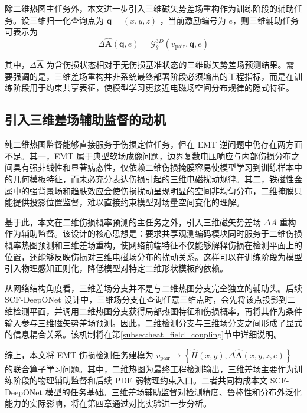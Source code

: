 除二维热图主任务外，本文进一步引入三维磁矢势差场重构作为训练阶段的辅助任务。设三维归一化查询点为
$
\mathbf q=(x,y,z)
$
，当前激励编号为 $e$，则三维辅助任务可表示为
\begin{equation}
\label{eq:field_task}
\Delta \hat{\mathbf A}(\mathbf q,e)
=
\mathcal{G}_{\theta}^{3D}
\left(
v_{\mathrm{pair}},\mathbf q,e
\right)
\end{equation}

其中，$\Delta \hat{\mathbf A}$ 为含伤损状态相对于无伤损基准状态的三维磁矢势差场预测结果。需要强调的是，三维差场重构并非系统最终部署阶段必须输出的工程指标，而是在训练阶段用于约束共享表征，使模型学习更接近电磁场空间分布规律的隐式特征。

\subsection{引入三维差场辅助监督的动机}
\label{subsec:auxiliary_field_motivation}

纯二维热图监督能够直接服务于伤损定位任务，但在 EMT 逆问题中仍存在两方面不足。其一，EMT 属于典型软场成像问题，边界复数电压响应与内部伤损分布之间具有强非线性和显著病态性，仅依赖二维伤损掩膜容易使模型学习到训练样本中的几何模板特征，而未必充分表达伤损引起的三维电磁扰动规律。其二，铁磁性金属中的强背景场和趋肤效应会使伤损扰动呈现明显的空间非均匀分布，二维掩膜只能提供投影位置监督，难以直接约束模型对场量空间变化的理解。

基于此，本文在二维伤损概率预测的主任务之外，引入三维磁矢势差场 $\Delta A$ 重构作为辅助监督。该设计的核心思想是：要求共享观测编码模块同时服务于二维伤损概率热图预测和三维差场重构，使网络前端特征不仅能够解释伤损在检测平面上的位置，还能够反映伤损对三维电磁场分布的扰动关系。这样可以在训练阶段为模型引入物理感知正则化，降低模型对特定二维形状模板的依赖。

从网络结构角度看，三维差场分支并不是与二维热图分支完全独立的辅助头。后续 SCF-DeepONet 设计中，三维场分支在查询任意三维点时，会先将该点投影到二维检测平面，并调用二维热图分支获得局部热图特征和伤损概率，再将其作为条件输入参与三维磁矢势差场预测。因此，二维检测分支与三维场分支之间形成了显式的信息耦合关系。该机制将在第\ref{subsec:heat_field_coupling}节中详细说明。

综上，本文将 EMT 伤损检测任务建模为
$
v_{\mathrm{pair}}
\longrightarrow
\left\{
\hat H(x,y),
\Delta \hat{\mathbf A}(x,y,z,e)
\right\}
$
的联合算子学习问题。其中，二维热图为最终工程检测输出，三维差场主要作为训练阶段的物理辅助监督和后续 PDE 弱物理约束入口。二者共同构成本文 SCF-DeepONet 模型的任务基础。三维差场辅助监督对检测精度、鲁棒性和分布外泛化能力的实际影响，将在第四章通过对比实验进一步分析。

